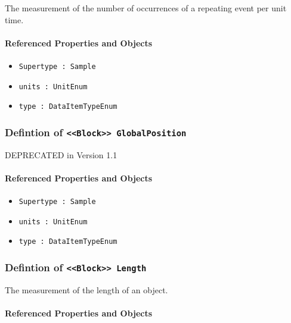\FloatBarrier

The measurement of the number of occurrences of a repeating event per unit time.

\FloatBarrier
\paragraph{Referenced Properties and Objects}

\begin{itemize}
\item \texttt{Supertype : Sample}

\item \texttt{units : UnitEnum}

\item \texttt{type : DataItemTypeEnum}

\end{itemize}
\FloatBarrier
\subsubsection{Defintion of \texttt{<<Block>> GlobalPosition}}
  \label{type:GlobalPosition}

\FloatBarrier

DEPRECATED in Version 1.1

\FloatBarrier
\paragraph{Referenced Properties and Objects}

\begin{itemize}
\item \texttt{Supertype : Sample}

\item \texttt{units : UnitEnum}

\item \texttt{type : DataItemTypeEnum}

\end{itemize}
\FloatBarrier
\subsubsection{Defintion of \texttt{<<Block>> Length}}
  \label{type:Length}

\FloatBarrier

The measurement of the length of an object.

\FloatBarrier
\paragraph{Referenced Properties and Objects}

